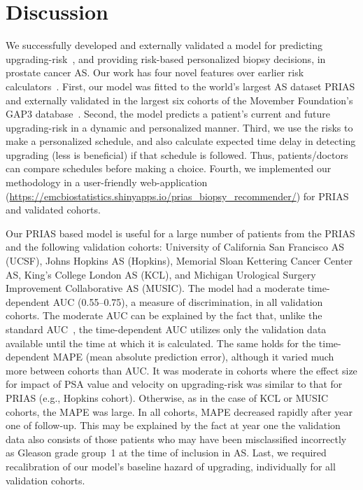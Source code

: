 \section{Discussion}
We successfully developed and externally validated a model for predicting upgrading-risk~\citep{bruinsma2017expert}, and providing risk-based personalized biopsy decisions, in prostate cancer AS.
Our work has four novel features over earlier risk calculators~\citep{coley2017prediction,ankerst2015precision}. First, our model was fitted to the world's largest AS dataset PRIAS and externally validated in the largest six cohorts of the Movember Foundation's GAP3 database~\citep{gap3_2018}. Second, the model predicts a patient's current and future upgrading-risk in a dynamic and personalized manner. Third, we use the risks to make a personalized schedule, and also calculate expected time delay in detecting upgrading (less is beneficial) if that schedule is followed. Thus, patients/doctors can compare schedules before making a choice. Fourth, we implemented our methodology in a user-friendly web-application (\url{https://emcbiostatistics.shinyapps.io/prias_biopsy_recommender/}) for PRIAS and validated cohorts.

Our PRIAS based model is useful for a large number of patients from the PRIAS and the following validation cohorts: University of California San Francisco AS (UCSF), Johns Hopkins AS (Hopkins), Memorial Sloan Kettering Cancer Center AS, King's College London AS (KCL), and Michigan Urological Surgery Improvement Collaborative AS (MUSIC). The model had a moderate time-dependent AUC (0.55--0.75), a measure of discrimination, in all validation cohorts. The moderate AUC can be explained by the fact that, unlike the standard AUC~\citep{steyerberg2010assessing}, the time-dependent AUC utilizes only the validation data available until the time at which it is calculated. The same holds for the time-dependent MAPE (mean absolute prediction error), although it varied much more between cohorts than AUC. It was moderate in cohorts where the effect size for impact of PSA value and velocity on upgrading-risk was similar to that for PRIAS (e.g., Hopkins cohort). Otherwise, as in the case of KCL or MUSIC cohorts, the MAPE was large. In all cohorts, MAPE decreased rapidly after year one of follow-up. This may be explained by the fact at year one the validation data also consists of those patients who may have been misclassified incorrectly as Gleason grade group~1 at the time of inclusion in AS. Last, we required recalibration of our model's baseline hazard of upgrading, individually for all validation cohorts.

